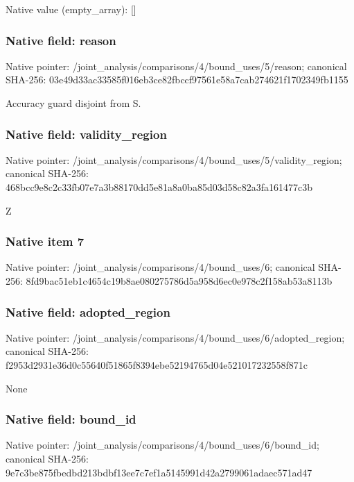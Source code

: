 \documentclass[10pt,a4paper]{article}
\begin{document}
Native value (empty\_\allowbreak{}array): []

\subsubsection{Native field: reason}
Native pointer: /joint\_\allowbreak{}analysis/comparisons/4/bound\_\allowbreak{}uses/5/reason; canonical SHA-256: 03e49d33ac33585f016eb3ce82fbccf97561e58a7cab274621f1702349fb1155

\begingroup\raggedright\sloppy Accuracy guard disjoint from S.\par\endgroup

\subsubsection{Native field: validity\_\allowbreak{}region}
Native pointer: /joint\_\allowbreak{}analysis/comparisons/4/bound\_\allowbreak{}uses/5/validity\_\allowbreak{}region; canonical SHA-256: 468bcc9e8c2c33fb07e7a3b88170dd5e81a8a0ba85d03d58c82a3fa161477c3b

\begingroup\raggedright\sloppy Z\par\endgroup

\subsubsection{Native item 7}
Native pointer: /joint\_\allowbreak{}analysis/comparisons/4/bound\_\allowbreak{}uses/6; canonical SHA-256: 8fd9bac51eb1c4654c19b8ae080275786d5a958d6ec0e978c2f158ab53a8113b

\subsubsection{Native field: adopted\_\allowbreak{}region}
Native pointer: /joint\_\allowbreak{}analysis/comparisons/4/bound\_\allowbreak{}uses/6/adopted\_\allowbreak{}region; canonical SHA-256: f2953d2931e36d0c55640f51865f8394ebe52194765d04e521017232558f871c

\begingroup\raggedright\sloppy None\par\endgroup

\subsubsection{Native field: bound\_\allowbreak{}id}
Native pointer: /joint\_\allowbreak{}analysis/comparisons/4/bound\_\allowbreak{}uses/6/bound\_\allowbreak{}id; canonical SHA-256: 9e7c3be875fbedbd213bdbf13ee7c7ef1a5145991d42a2799061adaec571ad47
\end{document}
